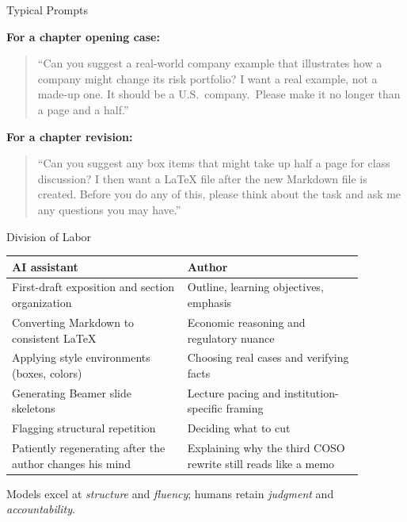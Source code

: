 \documentclass[aspectratio=169]{beamer}
\begin{document}
\begin{frame}{Typical Prompts}

\textbf{For a chapter opening case:}
\begin{quote}\small
``Can you suggest a real-world company example that illustrates how a
company might change its risk portfolio? I want a real example, not a
made-up one. It should be a U.S.\ company.\ Please make it no longer than
a page and a half.''
\end{quote}

\medskip
\textbf{For a chapter revision:}
\begin{quote}\small
``Can you suggest any box items that might take up half a page for class
discussion? I then want a \LaTeX{} file after the new Markdown file is
created. Before you do any of this, please think about the task and ask me
any questions you may have.''
\end{quote}

\end{frame}

\begin{frame}{Division of Labor}

\begin{center}
\small
\begin{tabular}{@{}p{0.44\linewidth}p{0.44\linewidth}@{}}
\toprule
\textbf{AI assistant} & \textbf{Author} \\
\midrule
First-draft exposition and section organization
  & Outline, learning objectives, emphasis \\[0.5em]
Converting Markdown to consistent \LaTeX{}
  & Economic reasoning and regulatory nuance \\[0.5em]
Applying style environments (boxes, colors)
  & Choosing real cases and verifying facts \\[0.5em]
Generating Beamer slide skeletons
  & Lecture pacing and institution-specific framing \\[0.5em]
Flagging structural repetition
  & Deciding what to cut \\[0.5em]
Patiently regenerating after the author changes his mind
  & Explaining why the third COSO rewrite still reads like a memo \\
\bottomrule
\end{tabular}
\end{center}

\bigskip
\small
Models excel at \emph{structure} and \emph{fluency};
humans retain \emph{judgment} and \emph{accountability}.

\end{frame}
\end{document}
